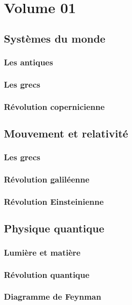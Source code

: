 \chapter{Volume 01}

\section{Systèmes du monde}
    \subsection{Les antiques}
    \subsection{Les grecs}
    \subsection{Révolution copernicienne}

\section{Mouvement et relativité}
    \subsection{Les grecs}
    \subsection{Révolution galiléenne}
    \subsection{Révolution Einsteinienne}

\section{Physique quantique}
  \subsection{Lumière et matière}
  \subsection{Révolution quantique}
  \subsection{Diagramme de Feynman}

